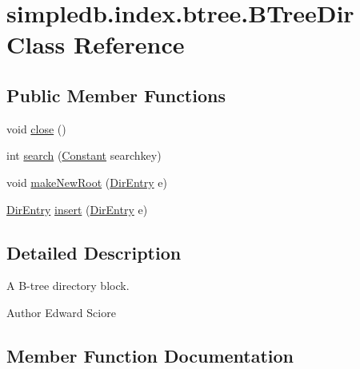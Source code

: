 \hypertarget{classsimpledb_1_1index_1_1btree_1_1BTreeDir}{}\section{simpledb.\+index.\+btree.\+B\+Tree\+Dir Class Reference}
\label{classsimpledb_1_1index_1_1btree_1_1BTreeDir}
\subsection*{Public Member Functions}
\begin{DoxyCompactItemize}
\item 
void \hyperlink{classsimpledb_1_1index_1_1btree_1_1BTreeDir_aca9a0ddfcdddbcd4e8c47d1548dc45b7}{close} ()
\item 
int \hyperlink{classsimpledb_1_1index_1_1btree_1_1BTreeDir_a3f04be4cc17e50a6a5048731ed83fabd}{search} (\hyperlink{classsimpledb_1_1query_1_1Constant}{Constant} searchkey)
\item 
void \hyperlink{classsimpledb_1_1index_1_1btree_1_1BTreeDir_ac06e5a1031dc5ce29f911b8473ee058b}{make\+New\+Root} (\hyperlink{classsimpledb_1_1index_1_1btree_1_1DirEntry}{Dir\+Entry} e)
\item 
\hyperlink{classsimpledb_1_1index_1_1btree_1_1DirEntry}{Dir\+Entry} \hyperlink{classsimpledb_1_1index_1_1btree_1_1BTreeDir_afa780e1626a87518225351bc875b01ec}{insert} (\hyperlink{classsimpledb_1_1index_1_1btree_1_1DirEntry}{Dir\+Entry} e)
\end{DoxyCompactItemize}


\subsection{Detailed Description}
A B-\/tree directory block. \begin{DoxyAuthor}{Author}
Edward Sciore 
\end{DoxyAuthor}


\subsection{Member Function Documentation}
\mbox{\label{classsimpledb_1_1index_1_1btree_1_1BTreeDir_aca9a0ddfcdddbcd4e8c47d1548dc45b7}} 
